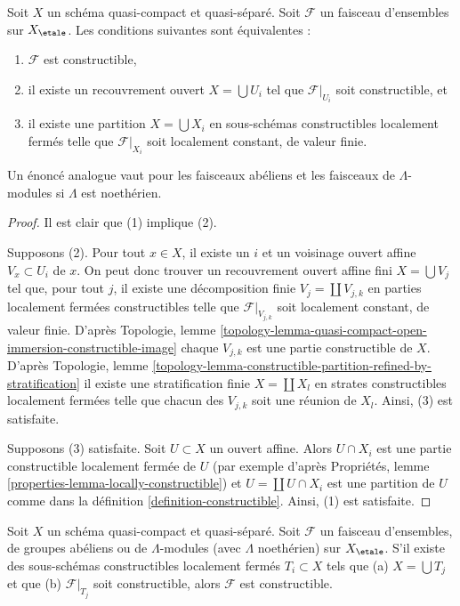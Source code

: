 \begin{lemma}
\label{lemma-constructible-quasi-compact-quasi-separated}
Soit $X$ un schéma quasi-compact et quasi-séparé. Soit $\mathcal{F}$
un faisceau d'ensembles sur $X_\etale$. Les conditions suivantes sont équivalentes :
\begin{enumerate}
\item $\mathcal{F}$ est constructible,
\item il existe un recouvrement ouvert $X = \bigcup U_i$ tel que
$\mathcal{F}|_{U_i}$ soit constructible, et
\item il existe une partition $X = \bigcup X_i$ en sous-schémas
constructibles localement fermés telle que $\mathcal{F}|_{X_i}$ soit
localement constant, de valeur finie.
\end{enumerate}
Un énoncé analogue vaut pour les faisceaux abéliens et les faisceaux de
$\Lambda$-modules si $\Lambda$ est noethérien.
\end{lemma}

\begin{proof}
Il est clair que (1) implique (2).

\medskip\noindent
Supposons (2). Pour tout $x \in X$, il existe un $i$ et un voisinage ouvert
affine $V_x \subset U_i$ de $x$. On peut donc trouver un recouvrement
ouvert affine fini $X = \bigcup V_j$ tel que, pour tout $j$, il
existe une décomposition finie $V_j = \coprod V_{j, k}$ en parties localement fermées
constructibles telle que $\mathcal{F}|_{V_{j, k}}$ soit localement constant,
de valeur finie. D'après Topologie, lemme
\ref{topology-lemma-quasi-compact-open-immersion-constructible-image}
chaque $V_{j, k}$ est une partie constructible de $X$.
D'après Topologie, lemme
\ref{topology-lemma-constructible-partition-refined-by-stratification}
il existe une stratification finie $X = \coprod X_l$ en strates constructibles
localement fermées telle que chacun des
$V_{j, k}$ soit une réunion de $X_l$. Ainsi, (3) est satisfaite.

\medskip\noindent
Supposons (3) satisfaite. Soit $U \subset X$ un ouvert affine.
Alors $U \cap X_i$ est une partie constructible localement fermée de $U$
(par exemple d'après Propriétés, lemme \ref{properties-lemma-locally-constructible})
et $U = \coprod U \cap X_i$ est une partition de $U$ comme dans la
définition \ref{definition-constructible}. Ainsi, (1) est satisfaite.
\end{proof}

\begin{lemma}
\label{lemma-constructible-constructible}
Soit $X$ un schéma quasi-compact et quasi-séparé.
Soit $\mathcal{F}$ un faisceau d'ensembles, de groupes abéliens ou de
$\Lambda$-modules (avec $\Lambda$ noethérien) sur $X_\etale$.
S'il existe des sous-schémas constructibles localement fermés $T_i \subset X$
tels que (a) $X = \bigcup T_j$ et que (b) $\mathcal{F}|_{T_j}$ soit
constructible, alors $\mathcal{F}$ est constructible.
\end{lemma}

